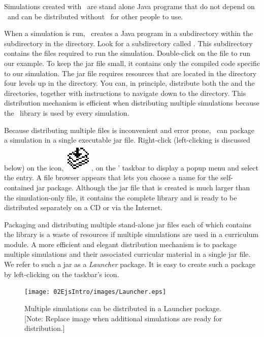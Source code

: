 Simulations created with \ejs\ are stand alone Java programs that do not depend on \ejs\ and can be distributed without \ejs\ for other people to use.

When a simulation is run, \ejs\ creates a Java program in a subdirectory within the  subdirectory in the  directory. Look for a subdirectory called  . This subdirectory contains the files required to run the simulation. Double-click on the  file to run our example. To keep the jar file small, it contains only the compiled code specific to our simulation.  The jar file requires resources that are located in the  directory four levels up in the  directory.  You can, in principle, distribute both the  and the  directories, together with instructions to navigate down to the  directory.  This distribution mechanism is efficient when distributing multiple simulations because the \ejs\ library is used by every simulation.

Because distributing multiple files is inconvenient and error prone, \ejs\ can package a simulation in a single executable jar file. Right-click (left-clicking is discussed below) on the  icon, \includegraphics[scale=\linescale]{images/package.eps}, on the \ejs' taskbar to display a popup menu and select the  entry. A file browser appears that lets you choose a name for the self-contained jar package. Although the jar file that is created is much larger than the simulation-only file, it contains the complete library and is ready to be distributed separately on a CD or via the Internet.

Packaging and distributing multiple stand-alone jar files each of which contains the library is a waste of resources if multiple simulations are used in a curriculum module.  A more efficient and elegant distribution mechanism is to package multiple simulations and their associated curricular material in a single jar file. We refer to such a jar as  a \emph{Launcher} package. It is easy to create such a package by left-clicking on the taskbar's  icon.

\begin{figure}[htb]
    \centering
  \texttt{[image: 02EjsIntro/images/Launcher.eps]}
    \caption{Multiple simulations can be distributed in a Launcher package. [Note: Replace image when additional simulations are ready for distribution.]}
    \label{fig:02EjsIntro/Launcher}
\end{figure}

